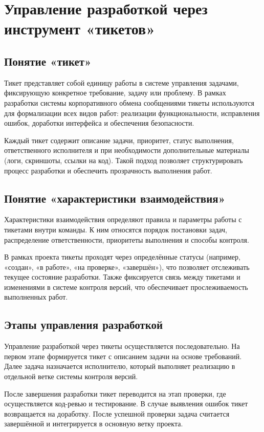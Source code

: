\documentclass[14pt,a4paper]{extarticle}
\begin{document}
\section{Управление разработкой через инструмент «тикетов»}

\subsection{Понятие «тикет»}

Тикет представляет собой единицу работы в системе управления задачами, фиксирующую конкретное требование, задачу или проблему. В рамках разработки системы корпоративного обмена сообщениями тикеты используются для формализации всех видов работ: реализации функциональности, исправления ошибок, доработки интерфейса и обеспечения безопасности.

Каждый тикет содержит описание задачи, приоритет, статус выполнения, ответственного исполнителя и при необходимости дополнительные материалы (логи, скриншоты, ссылки на код). Такой подход позволяет структурировать процесс разработки и обеспечить прозрачность выполнения работ.

\subsection{Понятие «характеристики взаимодействия»}

Характеристики взаимодействия определяют правила и параметры работы с тикетами внутри команды. К ним относятся порядок постановки задач, распределение ответственности, приоритеты выполнения и способы контроля.

В рамках проекта тикеты проходят через определённые статусы (например, «создан», «в работе», «на проверке», «завершён»), что позволяет отслеживать текущее состояние разработки. Также фиксируется связь между тикетами и изменениями в системе контроля версий, что обеспечивает прослеживаемость выполненных работ.

\subsection{Этапы управления разработкой}

Управление разработкой через тикеты осуществляется последовательно. На первом этапе формируется тикет с описанием задачи на основе требований. Далее задача назначается исполнителю, который выполняет реализацию в отдельной ветке системы контроля версий.

После завершения разработки тикет переводится на этап проверки, где осуществляется код-ревью и тестирование. В случае выявления ошибок тикет возвращается на доработку. После успешной проверки задача считается завершённой и интегрируется в основную ветку проекта.
\end{document}
